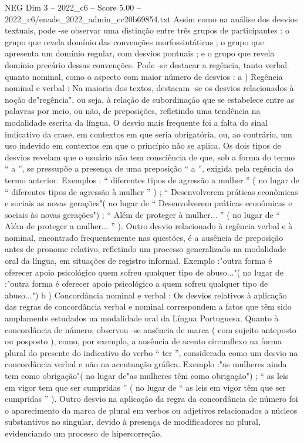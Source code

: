 \begin{textsample}{NEG Dim 3 – 2022\_c6 – Score 5.00 – 2022\_c6/enade\_2022\_admin\_cc20b69854.txt}
Assim como na análise dos desvios textuais, pode -se observar uma distinção entre três grupos de participantes : o grupo que revela domínio das convenções morfossintáticas ; o grupo que apresenta um domínio regular, com desvios pontuais ; e o grupo que revela domínio precário dessas convenções.
Pode -se destacar a regência, tanto verbal quanto nominal, como o aspecto com maior número de desvios : a ) Regência nominal e verbal : Na maioria dos textos, destacam -se os desvios relacionados à noção de"regência", ou seja, à relação de subordinação que se estabelece entre as palavras por meio, ou não, de preposições, refletindo uma tendência na modalidade escrita da língua.
O desvio mais frequente foi a falta do sinal indicativo da crase, em contextos em que seria obrigatória, ou, ao contrário, um uso indevido em contextos em que o princípio não se aplica.
Os dois tipos de desvios revelam que o usuário não tem consciência de que, sob a forma do termo “ a ”, se pressupõe a presença de uma preposição “ a ”, exigida pela regência do termo anterior.
Exemplos : “ diferentes tipos de agressão a mulher ” ( no lugar de “ diferentes tipos de agressão à mulher ” ) ; “ Desenvolverem práticas econômicas e sociais as novas gerações"( no lugar de “ Desenvolverem práticas econômicas e sociais às novas gerações") ; “ Além de proteger à mulher... ” ( no lugar de “ Além de proteger a mulher... ” ).
Outro desvio relacionado à regência verbal e à nominal, encontrado frequentemente nas questões, é a ausência de preposição antes de pronome relativo, refletindo um processo generalizado na modalidade oral da língua, em situações de registro informal.
Exemplo :"outra forma é oferecer apoio psicológico quem sofreu qualquer tipo de abuso..."( no lugar de :"outra forma é oferecer apoio psicológico a quem sofreu qualquer tipo de abuso...") b ) Concordância nominal e verbal : Os desvios relativos à aplicação das regras de concordância verbal e nominal correspondem a fatos que têm sido amplamente estudados na modalidade oral da Língua Portuguesa.
Quanto à concordância de número, observou -se ausência de marca ( com sujeito anteposto ou posposto ), como, por exemplo, a ausência de acento circunflexo na forma plural do presente do indicativo do verbo “ ter ”, considerada como um desvio na concordância verbal e não na acentuação gráfica.
Exemplo :"as mulheres ainda tem como obrigação"( no lugar de"as mulheres têm como obrigação") ; “ as leis em vigor tem que ser cumpridas ” ( no lugar de “ as leis em vigor têm que ser cumpridas ” ).
Outro desvio na aplicação da regra da concordância de número foi o aparecimento da marca de plural em verbos ou adjetivos relacionados a núcleos substantivos no singular, devido à presença de modificadores no plural, evidenciando um processo de hipercorreção.

\end{textsample}

